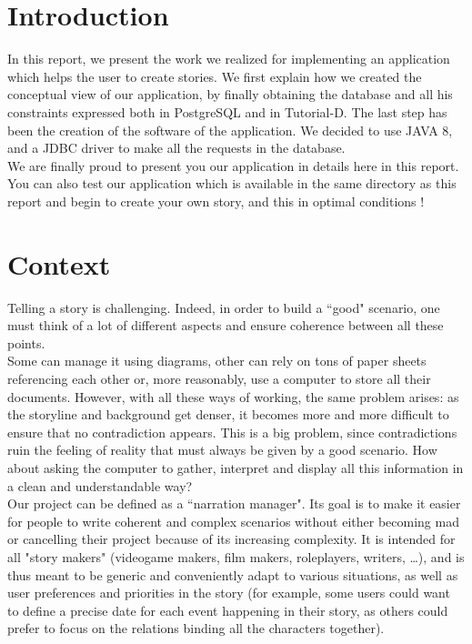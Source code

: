 \documentclass[a4paper ,12pt,french]{article}
\begin{document}

\thispagestyle{fancy}

\pagebreak
\setcounter{page}{1}
\pagestyle{fancy} %

\section{Introduction}

In this report, we present the work we realized for implementing an application which helps the user to create stories.
We first explain how we created the conceptual view of our application, by finally obtaining the database and all his constraints expressed both in PostgreSQL and in Tutorial-D. The last step has been the creation of the software of the application. We decided to use JAVA 8, and a JDBC driver to make all the requests in the database.\\
We are finally proud to present you our application in details here in this report.
You can also test our application which is available in the same directory as this report and begin to create your own story, and this in optimal conditions !


\section{Context}

Telling a story is challenging. Indeed, in order to build a ``good" scenario, one must think of a lot of different aspects and ensure coherence between all these points. \\

Some can manage it using diagrams, other can rely on tons of paper sheets referencing each other or, more reasonably, use a computer to store all their documents. However, with all these ways of working, the same problem arises: as the storyline and background get denser, it becomes more and more difficult to ensure that no contradiction appears. This is a big problem, since contradictions ruin the feeling of reality that must always be given by a good scenario. How about asking the computer to gather, interpret and display all this information in a clean and understandable way?\\

Our project can be defined as a ``narration manager". Its goal is to make it easier for people to write coherent and complex scenarios without either becoming mad or cancelling their project because of its increasing complexity. It is intended for all "story makers" (videogame makers, film makers, roleplayers, writers, \dots), and is thus meant to be generic and conveniently adapt to various situations, as well as user preferences and priorities in the story (for example, some users could want to define a precise date for each event happening in their story, as others could prefer to focus on the relations binding all the characters together).\\
\end{document}
